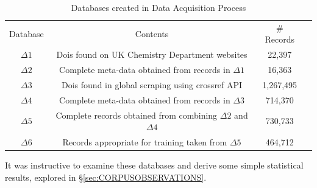 \begin{table}[H]
\caption{Databases created in Data Acquisition Process}
\label{tab:DATABASES}
\begin{tabular}{||c|c|c|c||}
\hline 
Database &  Contents & \# Records\\
$\Delta1$ & Dois found on UK Chemistry Department websites & 22,397 \\
$\Delta2$ & Complete meta-data obtained from records in $\Delta1$ & 16,363 \\
$\Delta3$ & Dois found in global scraping using crossref API & 1,267,495  \\
$\Delta4$ & Complete meta-data obtained from records in $\Delta3$ & 714,370 \\
$\Delta5$ & Complete records obtained from combining $\Delta2$ and $\Delta4$ & 730,733 \\
$\Delta6$ & Records appropriate for training taken from $\Delta5$ & 464,712 \\
\end{tabular}
\end{table}

It was instructive to examine these databases and derive some simple statistical results, explored in \S\ref{sec:CORPUSOBSERVATIONS}.